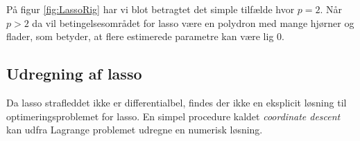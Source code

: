 På figur \ref{fig:LassoRig} har vi blot betragtet det simple tilfælde hvor $p=2$. 
Når \(p>2\) da vil betingelsesområdet for lasso være en polydron med mange hjørner og flader, som betyder, at flere estimerede parametre kan være lig 0.
%
%
\subsection{Udregning af lasso} \label{subsec:udregning_lasso}
Da lasso strafleddet ikke er differentialbel, findes der ikke en eksplicit løsning til optimeringsproblemet for lasso.
En simpel procedure kaldet \textit{coordinate descent} kan udfra Lagrange problemet udregne en numerisk løsning. 

